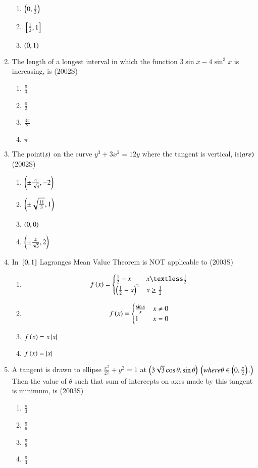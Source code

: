 \documentclass[journal,10pt,twocolumn]{IEEEtran}
\theoremstyle{remark}
\begin{document}
\begin{enumerate}[start=9]
\begin{enumerate}
    \item $\left(0,\frac{1}{2}\right)$
    \item ${}\left[\frac{1}{2},1\right]$
    \item $\left(0,1\right)$
\end{enumerate}
\item The length of a longest interval in which the function $3\sin x-4\sin^3x$ is increasing, is \hfill {(2002S)} \\
\begin{enumerate}
    \item $\frac{\pi}{3}$
    \item $\frac{\pi}{2}$
    \item $\frac{3\pi}{2}$
    \item $\pi$
\end{enumerate}
\item The point$\left(s\right)$ on the curve $y^3+3x^2=12y$ where the tangent is vertical, is$\left(are\right)$ \hfill{(2002S)} \\
\begin{enumerate}
    \item $\left(\pm \frac{4}{\sqrt{3}},-2\right)$
    \item $\left(\pm \sqrt{\frac{11}{3}},1\right)$
    \item $\left(0,0\right)$
    \item $\left(\pm \frac{4}{\sqrt{3}},2\right)$
\end{enumerate}
\item In ${}\left[0,1\right]$ Lagranges Mean Value Theorem is NOT applicable to \hfill {(2003S)} \\
\begin{enumerate}
    \item $$  f\brak{x} = 
\begin{cases} 
\frac{1}{2}-x &  x \textless \frac{1}{2}\\
\brak{\frac{1}{2}-x}^2 & x \geq \frac{1}{2}
\end{cases}
$$
    \item $$  f\left(x\right) = 
\begin{cases} 
\frac{\sin x}{x} &  x \neq 0\\
1 & x = 0
\end{cases}
$$
    \item $f\left(x\right)=x\left\vert x\right\vert$
    \item $f\left(x\right)=\left\vert x\right\vert$
\end{enumerate}
\item A tangent is drawn to ellipse $\frac{x^2}{27}+y^2=1$ at $\left(3\sqrt{3}\cos \theta, \sin \theta\right)$ $\left(where \theta \in \left(0,\frac{\pi}{2}\right).\right)$ Then the value of $\theta$ such that sum of intercepts on axes made by this tangent is minimum, is \hfill {(2003S)} \\
\begin{enumerate}
    \item $\frac{\pi}{3}$
    \item $\frac{\pi}{6}$
    \item $\frac{\pi}{8}$
    \item $\frac{\pi}{4}$
\end{enumerate}
\end{enumerate}
\end{document}
